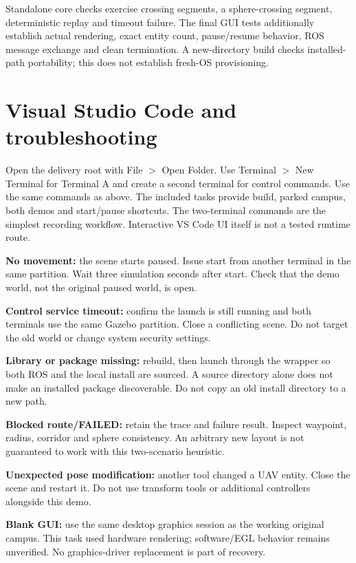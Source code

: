 Standalone core checks exercise crossing segments, a sphere-crossing segment, deterministic replay and timeout failure. The final GUI tests additionally establish actual rendering, exact entity count, pause/resume behavior, ROS message exchange and clean termination. A new-directory build checks installed-path portability; this does not establish fresh-OS provisioning.



\section{Visual Studio Code and troubleshooting}
Open the delivery root with File $>$ Open Folder. Use Terminal $>$ New Terminal for Terminal A and create a second terminal for control commands. Use the same commands as above. The included tasks provide build, parked campus, both demos and start/pause shortcuts. The two-terminal commands are the simplest recording workflow. Interactive VS Code UI itself is not a tested runtime route.

\textbf{No movement:} the scene starts paused. Issue start from another terminal in the same partition. Wait three simulation seconds after start. Check that the demo world, not the original paused world, is open.

\textbf{Control service timeout:} confirm the launch is still running and both terminals use the same Gazebo partition. Close a conflicting scene. Do not target the old world or change system security settings.

\textbf{Library or package missing:} rebuild, then launch through the wrapper so both ROS and the local install are sourced. A source directory alone does not make an installed package discoverable. Do not copy an old install directory to a new path.

\textbf{Blocked route/FAILED:} retain the trace and failure result. Inspect waypoint, radius, corridor and sphere consistency. An arbitrary new layout is not guaranteed to work with this two-scenario heuristic.

\textbf{Unexpected pose modification:} another tool changed a UAV entity. Close the scene and restart it. Do not use transform tools or additional controllers alongside this demo.

\textbf{Blank GUI:} use the same desktop graphics session as the working original campus. This task used hardware rendering; software/EGL behavior remains unverified. No graphics-driver replacement is part of recovery.

